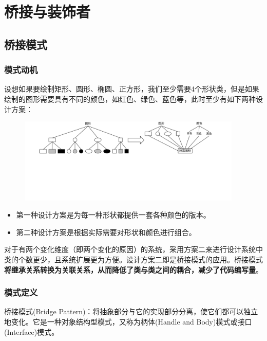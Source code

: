 \section{桥接与装饰者}

\subsection{桥接模式}

\subsubsection{模式动机}
设想如果要绘制矩形、圆形、椭圆、正方形，我们至少需要4个形状类，但是如果绘制的图形需要具有不同的颜色，如红色、绿色、蓝色等，此时至少有如下两种设计方案：
\begin{figure}[H]
    \vspace{-0.5em}
	\centering
	\includegraphics[width=0.95\textwidth]{images/桥接模式动机.pdf}
    \vspace{-1em}
\end{figure}
\begin{itemize}
    \item 第一种设计方案是为每一种形状都提供一套各种颜色的版本。
    \item 第二种设计方案是根据实际需要对形状和颜色进行组合。
\end{itemize}

对于有两个变化维度（即两个变化的原因）的系统，采用方案二来进行设计系统中类的个数更少，且系统扩展更为方便。设计方案二即是桥接模式的应用。桥接模式\textbf{将继承关系转换为关联关系，从而降低了类与类之间的耦合，减少了代码编写量}。

\subsubsection{模式定义}
桥接模式(Bridge Pattern)：将抽象部分与它的实现部分分离，使它们都可以独立地变化。它是一种对象结构型模式，又称为柄体(Handle and Body)模式或接口(Interface)模式。

